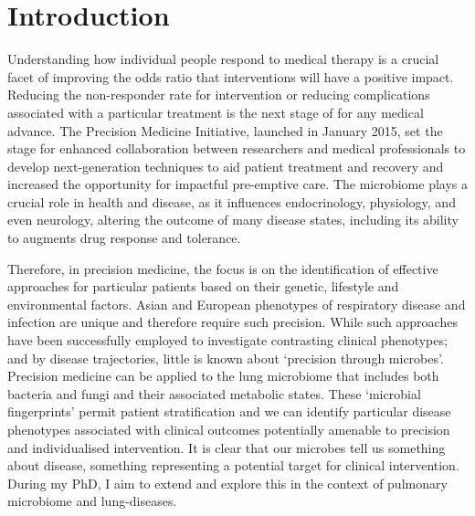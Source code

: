 \chapter*{Introduction}

Understanding how individual people respond to medical therapy is a crucial facet of improving the odds ratio that interventions will have a positive impact. Reducing the non-responder rate for intervention or reducing complications associated with a particular treatment is the next stage of for any medical advance. The Precision Medicine Initiative, launched in January 2015, set the stage for enhanced collaboration between researchers and medical professionals to develop next-generation techniques to aid patient treatment and recovery and increased the opportunity for impactful pre-emptive care. The microbiome plays a crucial role in health and disease, as it influences endocrinology, physiology, and even neurology, altering the outcome of many disease states, including its ability to augments drug response and tolerance.

Therefore, in precision medicine, the focus is on the identification of effective approaches for particular patients based on their genetic, lifestyle and environmental factors. Asian and European phenotypes of respiratory disease and infection are unique and therefore require such precision. While such approaches have been successfully employed to investigate contrasting clinical phenotypes; and by disease trajectories, little is known about `precision through microbes'. Precision medicine can be applied to the lung microbiome that includes both bacteria and fungi and their associated metabolic states. These `microbial fingerprints' permit patient stratification and we can identify particular disease phenotypes associated with clinical outcomes potentially amenable to precision and individualised intervention. It is clear that our microbes tell us something about disease, something representing a potential target for clinical intervention. During my PhD, I aim to extend and explore this in the context of pulmonary microbiome and lung-diseases. 

